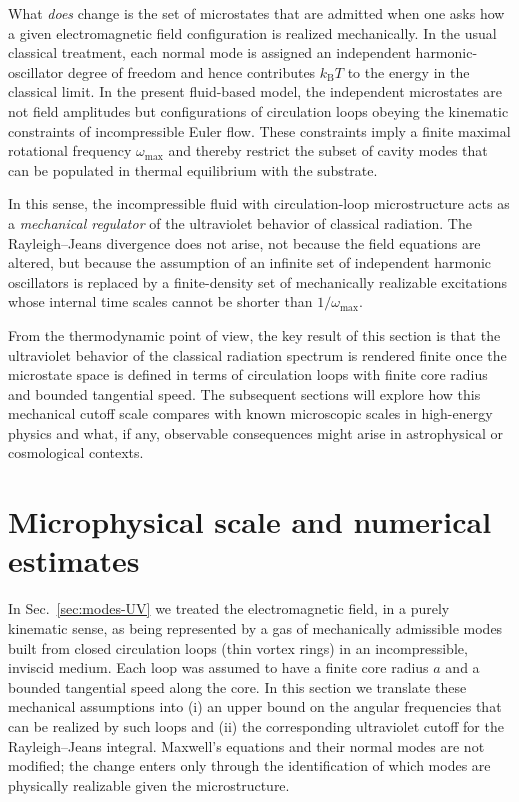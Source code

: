 \documentclass[11pt]{article}
\begin{document}
            What \emph{does} change is the set of microstates that are admitted when one asks
            how a given electromagnetic field configuration is realized mechanically.
            In the usual classical treatment, each normal mode is assigned an independent
            harmonic-oscillator degree of freedom and hence contributes $k_{\mathrm B}T$ to
            the energy in the classical limit. In the present fluid-based model, the
            independent microstates are not field amplitudes but configurations of circulation
            loops obeying the kinematic constraints of incompressible Euler flow. These
            constraints imply a finite maximal rotational frequency $\omega_{\max}$ and
            thereby restrict the subset of cavity modes that can be populated in thermal
            equilibrium with the substrate.

            In this sense, the incompressible fluid with circulation-loop microstructure
            acts as a \emph{mechanical regulator} of the ultraviolet behavior of classical
            radiation. The Rayleigh--Jeans divergence does not arise, not because the
            field equations are altered, but because the assumption of an infinite set of
            independent harmonic oscillators is replaced by a finite-density set of
            mechanically realizable excitations whose internal time scales cannot be
            shorter than $1/\omega_{\max}$.

            From the thermodynamic point of view, the key result of this section is that
            the ultraviolet behavior of the classical radiation spectrum is rendered finite
            once the microstate space is defined in terms of circulation loops with finite
            core radius and bounded tangential speed. The subsequent sections will explore
            how this mechanical cutoff scale compares with known microscopic scales in
            high-energy physics and what, if any, observable consequences might arise in
            astrophysical or cosmological contexts.

    \section{Microphysical scale and numerical estimates}
        \label{sec:micro-scale}

        In Sec.~\ref{sec:modes-UV} we treated the electromagnetic field, in a purely kinematic
        sense, as being represented by a gas of mechanically admissible modes built from closed
        circulation loops (thin vortex rings) in an incompressible, inviscid medium. Each loop
        was assumed to have a finite core radius $a$ and a bounded tangential speed along the
        core. In this section we translate these mechanical assumptions into (i) an upper bound
        on the angular frequencies that can be realized by such loops and (ii) the corresponding
        ultraviolet cutoff for the Rayleigh--Jeans integral. Maxwell's equations and their
        normal modes are not modified; the change enters only through the identification of
        which modes are physically realizable given the microstructure.
\end{document}
